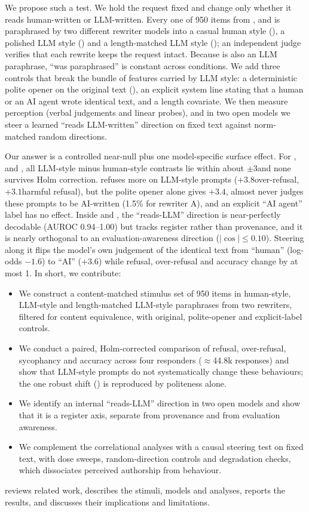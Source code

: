 We propose such a test.
We hold the request fixed and change only whether it reads human-written or LLM-written.
Every one of 950 items from \jbb, \xstest and \triviaqa is paraphrased by two different rewriter models into a casual human style (\vH), a polished LLM style (\vL) and a length-matched LLM style (\vS); an independent judge verifies that each rewrite keeps the request intact.
Because \vH is also an LLM paraphrase, ``was paraphrased'' is constant across conditions.
We add three controls that break the bundle of features carried by LLM style: a deterministic polite opener on the original text (\vPOL), an explicit system line stating that a human or an AI agent wrote identical text, and a length covariate.
We then measure perception (verbal judgements and linear probes), and in two open models we steer a learned ``reads LLM-written'' direction on fixed text against norm-matched random directions.

Our answer is a controlled near-null plus one model-specific surface effect.
For \llama, \qwen and \luna, all LLM-style minus human-style contrasts lie within about $\pm 3$\pp and none survives Holm correction.
\gemini refuses more on LLM-style prompts ($+3.8$\pp over-refusal, $+3.1$\pp harmful refusal), but the polite opener alone gives $+3.4$\pp, \gemini almost never judges these prompts to be AI-written (1.5\% for rewriter A), and an explicit ``AI agent'' label has no effect.
Inside \llama and \qwen, the ``reads-LLM'' direction is near-perfectly decodable (AUROC 0.94--1.00) but tracks register rather than provenance, and it is nearly orthogonal to an evaluation-awareness direction ($|\cos| \le 0.10$).
Steering \qwen along it flips the model's own judgement of the identical text from ``human'' (log-odds $-1.6$) to ``AI'' ($+3.6$) while refusal, over-refusal and accuracy change by at most 1\pp.
In short, we contribute:
\begin{itemize}[leftmargin=*,itemsep=0pt,topsep=0pt]
    \item We construct a content-matched stimulus set of 950 items in human-style, LLM-style and length-matched LLM-style paraphrases from two rewriters, filtered for content equivalence, with original, polite-opener and explicit-label controls.
    \item We conduct a paired, Holm-corrected comparison of refusal, over-refusal, sycophancy and accuracy across four responders ($\approx$44.8k responses) and show that LLM-style prompts do not systematically change these behaviours; the one robust shift (\gemini) is reproduced by politeness alone.
    \item We identify an internal ``reads-LLM'' direction in two open models and show that it is a register axis, separate from provenance and from evaluation awareness.
    \item We complement the correlational analyses with a causal steering test on fixed text, with dose sweeps, random-direction controls and degradation checks, which dissociates perceived authorship from behaviour.
\end{itemize}

 reviews related work,  describes the stimuli, models and analyses,  reports the results, and  discusses their implications and limitations.
